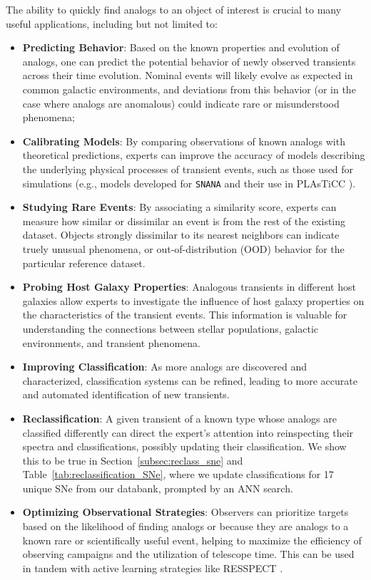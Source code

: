 \documentclass[twocolumn]{aastex63}
\begin{document}
The ability to quickly find analogs to an object of interest is crucial to many useful applications, including but not limited to: 
\begin{itemize}
    \item \textbf{Predicting Behavior}: Based on the known properties and evolution of analogs, one can predict the potential behavior of newly observed transients across their time evolution. Nominal events will likely evolve as expected in common galactic environments, and deviations from this behavior (or in the case where analogs are anomalous) could indicate rare or misunderstood phenomena; 
    \item \textbf{Calibrating Models}: By comparing observations of known analogs with theoretical predictions, experts can improve the accuracy of models describing the underlying physical processes of transient events, such as those used for simulations (e.g., models developed for \texttt{SNANA} \citep{Kessler2009} and their use in PLAsTiCC \cite{Hlozek2020}).
    \item \textbf{Studying Rare Events}: By associating a similarity score, experts can measure how similar or dissimilar an event is from the rest of the existing dataset. Objects strongly dissimilar to its nearest neighbors can indicate truely unusual phenomena, or out-of-distribution (OOD) behavior for the particular reference dataset.
    \item \textbf{Probing Host Galaxy Properties}: Analogous transients in different host galaxies allow experts to investigate the influence of host galaxy properties on the characteristics of the transient events. This information is valuable for understanding the connections between stellar populations, galactic environments, and transient phenomena.
    \item \textbf{Improving Classification}: As more analogs are discovered and characterized, classification systems can be refined, leading to more accurate and automated identification of new transients.
    \item \textbf{Reclassification}: A given transient of a known type whose analogs are classified differently can direct the expert's attention into reinspecting their spectra and classifications, possibly updating their classification. We show this to be true in Section~\ref{subsec:reclass_sne} and Table~\ref{tab:reclassification_SNe}, where we update classifications for 17 unique SNe from our databank, prompted by an ANN search. 
    \item \textbf{Optimizing Observational Strategies}: Observers can prioritize targets based on the likelihood of finding analogs or because they are analogs to a known rare or scientifically useful event, helping to maximize the efficiency of observing campaigns and the utilization of telescope time. This can be used in tandem with active learning strategies like RESSPECT \citep{Kennamer2020}.

\end{itemize}
\end{document}
